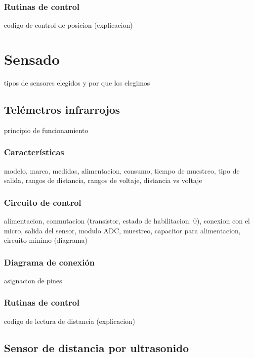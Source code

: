 \subsubsection{Rutinas de control}
\label{}

codigo de control de posicion (explicacion)

\section{Sensado}
\label{}

tipos de sensores elegidos y por que los elegimos

\subsection{Tel\'emetros infrarrojos}
\label{}

principio de funcionamiento

\subsubsection{Caracter\'isticas}
\label{}

modelo, marca, medidas, alimentacion, consumo, tiempo de muestreo, tipo de salida, rangos de distancia, rangos de voltaje, distancia vs voltaje

\subsubsection{Circuito de control}
\label{}

alimentacion, conmutacion (transistor, estado de habilitacion: 0), conexion con el micro, salida del sensor, modulo ADC, muestreo, capacitor para alimentacion, circuito minimo (diagrama)

\subsubsection{Diagrama de conexi\'on}
\label{}

asignacion de pines

\subsubsection{Rutinas de control}
\label{}

codigo de lectura de distancia (explicacion)

\subsection{Sensor de distancia por ultrasonido}
\label{}

